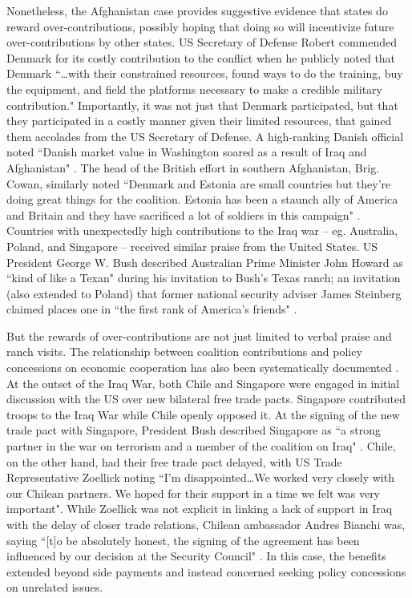 \documentclass[12pt,letterpaper]{article}
\begin{document}
	Nonetheless, the Afghanistan case provides suggestive evidence that states do reward over-contributions, possibly hoping that doing so will incentivize future over-contributions by other states. US Secretary of Defense Robert \citet{gates_securitydefenseagenda_2011} commended Denmark for its costly contribution to the conflict when he publicly noted that Denmark ``\ldots with their constrained resources, found ways to do the training, buy the equipment, and field the platforms necessary to make a credible military contribution." Importantly, it was not just that Denmark participated, but that they participated in a costly manner given their limited resources, that gained them accolades from the US Secretary of Defense. A high-ranking Danish official noted ``Danish market value in Washington soared as a result of Iraq and Afghanistan" \citep{henriksen_whatdiddenmark_2012}. The head of the British effort in southern Afghanistan, Brig. Cowan, similarly noted ``Denmark and Estonia are small countries but they're doing great things for the coalition. Estonia has been a staunch ally of America and Britain and they have sacrificed a lot of soldiers in this campaign" \citep{druzin_tinyestoniakeen_2009}. Countries with unexpectedly high contributions to the Iraq war -- eg. Australia, Poland, and Singapore -- received similar praise from the United States. US President George W. Bush described Australian Prime Minister John Howard as ``kind of like a Texan" during his invitation to Bush's Texas ranch; an invitation (also extended to Poland) that former national security adviser James Steinberg claimed places one in ``the first rank of America's friends" \citep{sanger_meanwhilebackranch_2003}.
	
	But the rewards of over-contributions are not just limited to verbal praise and ranch visits. The relationship between coalition contributions and policy concessions on economic cooperation has also been systematically documented \citep{long_tradingsecuritymilitary_2006}. At the outset of the Iraq War, both Chile and Singapore were engaged in initial discussion with the US over new bilateral free trade pacts. Singapore contributed troops to the Iraq War while Chile openly opposed it. At the signing of the new trade pact with Singapore, President Bush described Singapore as ``a strong partner in the war on terrorism and a member of the coalition on Iraq" \citep{armstrong_alliesrewardedtrade_2003}. Chile, on the other hand, had their free trade pact delayed, with US Trade Representative Zoellick noting ``I'm disappointed\ldots We worked very closely with our Chilean partners. We hoped for their support in a time we felt was very important". While Zoellick was not explicit in linking a lack of support in Iraq with the delay of closer trade relations, Chilean ambassador Andres Bianchi was, saying ``[t]o be absolutely honest, the signing of the agreement has been influenced by our decision at the Security Council" \citep{armstrong_alliesrewardedtrade_2003}. In this case, the benefits extended beyond side payments and instead concerned seeking policy concessions on unrelated issues.
\end{document}
